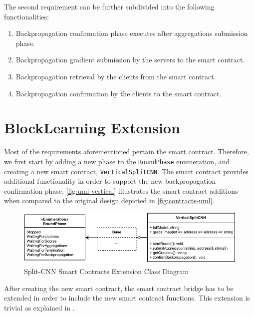 The second requirement can be further subdivided into the following functionalities:

\begin{enumerate}
    \item Backpropagation confirmation phase executes after aggregations submission phase.

    \item Backpropagation gradient submission by the servers to the smart contract.
    
    \item Backpropagation retrieval by the clients from the smart contract.
    
    \item Backpropagation confirmation by the clients to the smart contract.
\end{enumerate}

\section{BlockLearning Extension}

Most of the requirements aforementioned pertain the smart contract. Therefore, we first start by adding a new phase to the \texttt{RoundPhase} enumeration, and creating a new smart contract, \texttt{VerticalSplitCNN}. The smart contract provides additional functionality in order to support the new backpropagation confirmation phase. \autoref{fig:uml-vertical} illustrates the smart contract additions when compared to the original design depicted in \autoref{fig:contracts-uml}.

\begin{figure}[!ht]
    \centering
    \centering
    \includegraphics[width=1\textwidth]{graphics/smart-contract-uml-vertical.pdf}
    \caption{Split-CNN Smart Contracts Extension Class Diagram}
    \label{fig:uml-vertical}
\end{figure}

After creating the new smart contract, the smart contract bridge has to be extended in order to include the new smart contract functions. This extension is trivial as explained in .

